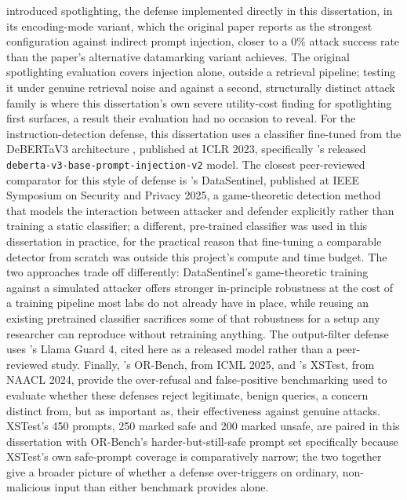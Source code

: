 \citet{hines2024defending} introduced spotlighting, the defense
implemented directly in this dissertation, in its encoding-mode variant,
which the original paper reports as the strongest configuration against
indirect prompt injection, closer to a 0\% attack success rate than the
paper's alternative datamarking variant achieves. The original
spotlighting evaluation covers injection alone, outside a retrieval
pipeline; testing it under genuine retrieval noise and against a second,
structurally distinct attack family is where this dissertation's own
severe utility-cost finding for spotlighting first surfaces, a result
their evaluation had no occasion to reveal. For the
instruction-detection defense, this dissertation uses a classifier
fine-tuned from the DeBERTaV3 architecture \citep{he2023debertav3},
published at ICLR 2023, specifically \citet{protectai2024deberta}'s
released \texttt{deberta-v3-base-prompt-injection-v2} model. The closest
peer-reviewed comparator for this style of defense is
\citet{liu2025datasentinel}'s DataSentinel, published at IEEE Symposium
on Security and Privacy 2025, a game-theoretic detection method that
models the interaction between attacker and defender explicitly rather
than training a static classifier; a different, pre-trained classifier
was used in this dissertation in practice, for the practical reason that
fine-tuning a comparable detector from scratch was outside this
project's compute and time budget. The two approaches trade off
differently: DataSentinel's game-theoretic training against a simulated
attacker offers stronger in-principle robustness at the cost of a
training pipeline most labs do not already have in place, while reusing
an existing pretrained classifier sacrifices some of that robustness for
a setup any researcher can reproduce without retraining anything. The
output-filter defense uses \citet{metaai2025llamaguard4}'s Llama Guard
4, cited here as a released model rather than a peer-reviewed study.
Finally, \citet{cui2025orbench}'s OR-Bench, from ICML 2025, and
\citet{rottger2024xstest}'s XSTest, from NAACL 2024, provide the
over-refusal and false-positive benchmarking used to evaluate whether
these defenses reject legitimate, benign queries, a concern distinct
from, but as important as, their effectiveness against genuine attacks.
XSTest's 450 prompts, 250 marked safe and 200 marked unsafe, are paired
in this dissertation with OR-Bench's harder-but-still-safe prompt set
specifically because XSTest's own safe-prompt coverage is comparatively
narrow; the two together give a broader picture of whether a defense
over-triggers on ordinary, non-malicious input than either benchmark
provides alone.

